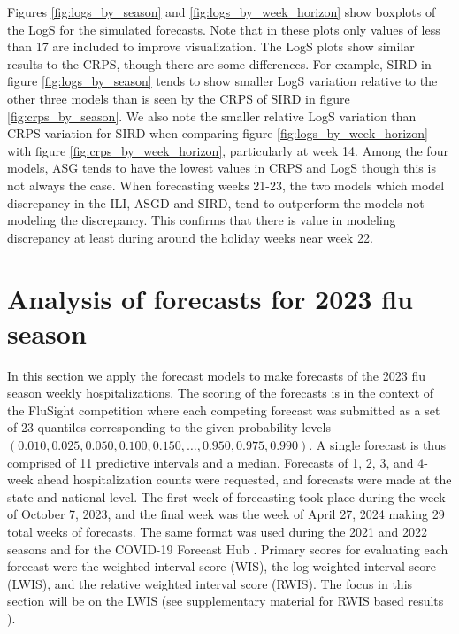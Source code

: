\documentclass[ba]{imsart}
\theoremstyle{plain}
\theoremstyle{definition}
\theoremstyle{remark}
\begin{document}
Figures \ref{fig:logs_by_season} and \ref{fig:logs_by_week_horizon} show boxplots of the LogS for the simulated forecasts. Note that in these plots only values of less than 17 are included to improve visualization.
The LogS plots show similar results to the CRPS, though there are some differences. For example, SIRD in figure \ref{fig:logs_by_season} tends to show smaller LogS variation relative to the other three models than is seen by the CRPS of SIRD in figure \ref{fig:crps_by_season}. 
We also note the smaller relative LogS variation than CRPS variation for SIRD when comparing figure \ref{fig:logs_by_week_horizon} with figure \ref{fig:crps_by_week_horizon}, particularly at week 14. 
Among the four models, ASG tends to have the lowest values in CRPS and LogS though this is not always the case. When forecasting weeks 21-23, the two models which model discrepancy in the ILI, ASGD and SIRD, tend to outperform the models not modeling the discrepancy. This confirms that there is value in modeling discrepancy at least during around the holiday weeks near week 22. 



























\section{Analysis of forecasts for 2023 flu season}
\label{sec:analysis}

In this section we apply the forecast models to make forecasts of the 2023 flu season weekly hospitalizations. The scoring of the forecasts is in the context of the FluSight competition where each competing forecast was submitted as a set of 23 quantiles corresponding to the given probability levels $(0.010, 0.025, 0.050, 0.100, 0.150, …, 0.950, 0.975, 0.990)$. A single forecast is thus comprised of 11 predictive intervals and a median.
Forecasts of 1, 2, 3, and 4-week ahead hospitalization counts were requested, and forecasts were made at the state and national level. The first week of forecasting took place during the week of October 7, 2023, and the final week was the week of April 27, 2024 making 29 total weeks of forecasts.
 The same format was used during the 2021 and 2022 seasons and for the COVID-19 Forecast Hub \cite[]{mathis2024evaluation, bracher2021evaluating}. 
 Primary scores for evaluating each forecast were the weighted interval score (WIS), the log-weighted interval score (LWIS), and the relative weighted interval score (RWIS). The focus in this section will be on the LWIS (see supplementary material for RWIS based results \cite[]{wadsworth2024bas}).
\end{document}
